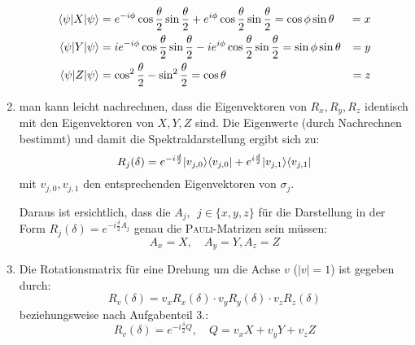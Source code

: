 \begin{enumerate}
        \begin{alignat*}{2}
        \langle \psi |X| \psi \rangle &= e^{-i \phi} \cos\frac{\theta }{2}
        \sin\frac{\theta }{2}+e^{i \phi} \cos\frac{\theta}{2} \sin\frac{\theta}{2} = \cos\phi\sin\theta &= x \\
        \langle \psi |Y| \psi \rangle &=
        i e^{-i \phi } \cos \frac{\theta }{2} \sin \frac{\theta }{2} - i e^{i \phi }
        \cos \frac{\theta }{2} \sin\frac{\theta }{2} = \sin\phi\sin\theta &=  y \\
        \langle \psi |Z| \psi \rangle &= \cos^2\frac{\theta}{2}-\sin^2\frac{\theta}{2} = \cos\theta &= z
        \end{alignat*}
\item man kann leicht nachrechnen, dass die Eigenvektoren von $R_x, R_y, R_z$
      identisch mit den Eigenvektoren von $X, Y, Z$ sind. Die Eigenwerte (durch
      Nachrechnen bestimmt) und damit die Spektraldarstellung ergibt sich zu:
        \[ R_j(\delta) = e^{-i\frac{d}{2}} | v_{j,0} \rangle\langle v_{j,0} | + e^{i\frac{d}{2}} | v_{j,1} \rangle\langle v_{j,1} | \]
      mit $v_{j,0}, v_{j,1}$ den entsprechenden Eigenvektoren von $\sigma_j$.

      Daraus ist ersichtlich, dass die $A_j,\ \ j \in \{x, y, z\}$ für die
      Darstellung in der Form $R_j(\delta) = e^{-i\frac{\delta}{2} A_j}$ genau die
      \textsc{Pauli}-Matrizen sein müssen:
        \[ A_x = X, \quad A_y = Y, A_z = Z \]
\item Die Rotationsmatrix für eine Drehung um die Achse $v$ ($|v| = 1$) ist gegeben durch:
        \[ R_v(\delta) = v_x R_x(\delta) \cdot v_y R_y(\delta) \cdot v_z R_z(\delta) \]
      beziehungsweise nach Aufgabenteil 3.:
        \[ R_v(\delta) = e^{-i\frac{\delta}{2}Q}, \quad Q = v_x X + v_y Y + v_z Z \]
\end{enumerate}
